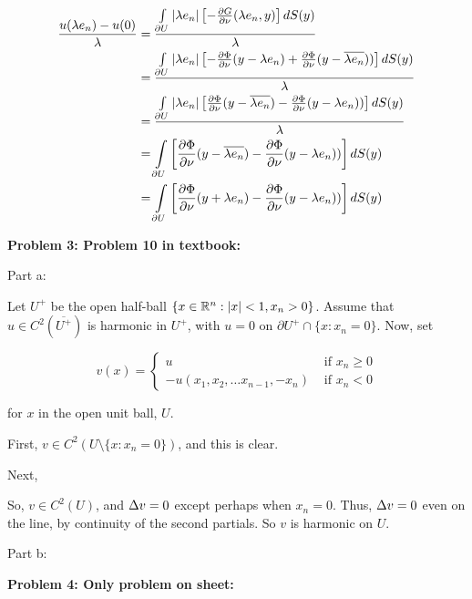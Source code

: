 \documentclass[a4paper,12pt]{article}
\begin{document}
\begin{align*}
\frac{u(\lambda e_n) - u(0)}{\lambda} &= \frac{\int\limits_{\partial U} \left\lvert \lambda e_n \right\rvert \left[- \frac{\partial G}{\partial \nu}(\lambda e_n,y)\right]dS(y)}{\lambda}\\
&=\frac{\int\limits_{\partial U} \left\lvert \lambda e_n  \right\rvert \left[- \frac{\partial \Phi}{\partial \nu}(y-\lambda e_n) + \frac{\partial \Phi}{\partial \nu}(y-\overline{\lambda e_n}))\right]dS(y)}{\lambda}\\
&=\frac{\int\limits_{\partial U} \left\lvert \lambda e_n \right\rvert \left[\frac{\partial \Phi}{\partial \nu}(y-\overline{\lambda e_n}) - \frac{\partial \Phi}{\partial \nu}(y-\lambda e_n))\right]dS(y)}{\lambda}\\
&=\int\limits_{\partial U} \left[\frac{\partial \Phi}{\partial \nu}(y-\overline{\lambda e_n}) - \frac{\partial \Phi}{\partial \nu}(y-\lambda e_n))\right]dS(y)\\
&=\int\limits_{\partial U} \left[\frac{\partial \Phi}{\partial \nu}(y+\lambda e_n) - \frac{\partial \Phi}{\partial \nu}(y-\lambda e_n))\right]dS(y)\\
\end{align*}


\shunt

{\bf Problem 3: Problem 10 in textbook:}

Part a:

Let $U^+$ be the open half-ball $\{ x \in \mathbb{R}^n : \left\lvert x \right\rvert < 1, x_n > 0\}$. Assume that $u \in C^2(\overline{U^+})$ is harmonic in $U^+$, with $u = 0$ on $\partial U^+ \cap \{x: x_n = 0\}$. Now, set

\begin{displaymath}
v(x) =
   \left\{
     \begin{array}{lr}
       u & \text{ if } x_n \geq 0\\
       -u(x_1,x_2, \ldots x_{n-1}, -x_n) & \text{ if } x_n < 0
     \end{array}
   \right.
\end{displaymath}

for $x$ in the open unit ball, $U$.

First, $v \in C^2( U \setminus \{x: x_n = 0\})$, and this is clear.

Next, %

So, $v \in C^2(U)$, and $\Delta v = 0$ except perhaps when $x_n = 0$. Thus, $\Delta v = 0$ even on the line, by continuity of the second partials. So $v$ is harmonic on $U$.

\shunt

Part b:


\shunt

{\bf Problem 4: Only problem on sheet:}

\shunt
\end{document}
